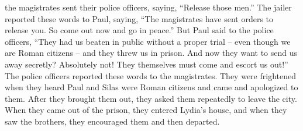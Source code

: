 {the magistrates
sent
their police officers,
saying,
“Release
those
men.”
The jailer
reported
these words
to
Paul,
saying, “The magistrates
have sent
orders to
release
you. So
come out
now
and go
in
peace.”
But
Paul
said
to
the police officers, “They had
us
beaten
in public
without a proper trial –
even though we are Roman citizens –
and they threw
us in
prison.
And
now
they want to send
us
away
secretly? Absolutely not! They themselves
must come
and escort
us
out!”
The police officers
reported
these
words
to the magistrates.
They were frightened
when
they heard
Paul and Silas were
Roman citizens
and
came
and apologized
to them.
After
they brought
them out,
they asked
them repeatedly to leave
the city.
When
they came out
of
the prison,
they entered
Lydia’s
house, and
when
they saw
the brothers,
they encouraged
them and
then departed.

}
